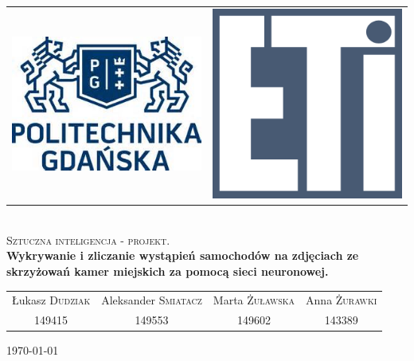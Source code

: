 \documentclass{article}
\begin{document}
\begin{titlepage}
\begin{center}

\begin{tabular}{c c}
\includegraphics[scale=0.5]{pg.jpg} & \includegraphics[scale=0.3]{eti.png}
\end{tabular}
\\[1.5cm]

\textsc{\LARGE Sztuczna inteligencja - projekt.}\\[1.0cm]

{ \huge \bfseries Wykrywanie i zliczanie wystąpień samochodów na zdjęciach ze skrzyżowań kamer miejskich za pomocą sieci neuronowej. \\[1.5cm] }

\noindent
\begin{tabular}[c]{c c c c}
Łukasz \textsc{Dudziak} & Aleksander \textsc{Smiatacz} & Marta \textsc{Żuławska} & Anna \textsc{Żurawki} \\
149415 & 149553 & 149602 & 143389 \\
\end{tabular}

\vfill
{\large \today}

\end{center}
\end{titlepage}
\end{document}
